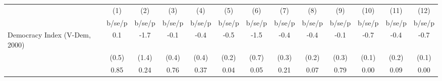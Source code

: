\begin{tabular}{l*{12}{c}}
\hline\hline
                    &\multicolumn{1}{c}{(1)}&\multicolumn{1}{c}{(2)}&\multicolumn{1}{c}{(3)}&\multicolumn{1}{c}{(4)}&\multicolumn{1}{c}{(5)}&\multicolumn{1}{c}{(6)}&\multicolumn{1}{c}{(7)}&\multicolumn{1}{c}{(8)}&\multicolumn{1}{c}{(9)}&\multicolumn{1}{c}{(10)}&\multicolumn{1}{c}{(11)}&\multicolumn{1}{c}{(12)}\\
                    &      b/se/p&      b/se/p&      b/se/p&      b/se/p&      b/se/p&      b/se/p&      b/se/p&      b/se/p&      b/se/p&      b/se/p&      b/se/p&      b/se/p\\
\hline
Democracy Index (V-Dem, 2000)&         0.1&        -1.7&        -0.1&        -0.4&        -0.5&        -1.5&        -0.4&        -0.4&        -0.1&        -0.7&        -0.4&        -0.7\\
                    &       (0.5)&       (1.4)&       (0.4)&       (0.4)&       (0.2)&       (0.7)&       (0.3)&       (0.2)&       (0.3)&       (0.1)&       (0.2)&       (0.1)\\
                    &        0.85&        0.24&        0.76&        0.37&        0.04&        0.05&        0.21&        0.07&        0.79&        0.00&        0.09&        0.00\\
\hline\hline
\end{tabular}
